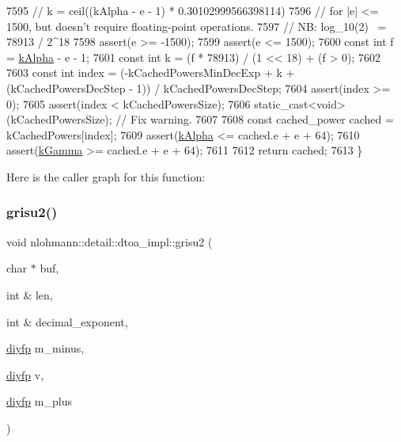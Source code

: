 \begin{DoxyCode}
7595     \textcolor{comment}{//      k = ceil((kAlpha - e - 1) * 0.30102999566398114)}
7596     \textcolor{comment}{// for |e| <= 1500, but doesn't require floating-point operations.}
7597     \textcolor{comment}{// NB: log\_10(2) ~= 78913 / 2^18}
7598     assert(e >= -1500);
7599     assert(e <=  1500);
7600     \textcolor{keyword}{const} \textcolor{keywordtype}{int} f = \hyperlink{namespacenlohmann_1_1detail_1_1dtoa__impl_ac1ea1316de0b4a219f707c76b1db1966}{kAlpha} - e - 1;
7601     \textcolor{keyword}{const} \textcolor{keywordtype}{int} k = (f * 78913) / (1 << 18) + (f > 0);
7602 
7603     \textcolor{keyword}{const} \textcolor{keywordtype}{int} index = (-kCachedPowersMinDecExp + k + (kCachedPowersDecStep - 1)) / kCachedPowersDecStep;
7604     assert(index >= 0);
7605     assert(index < kCachedPowersSize);
7606     \textcolor{keyword}{static\_cast<}\textcolor{keywordtype}{void}\textcolor{keyword}{>}(kCachedPowersSize); \textcolor{comment}{// Fix warning.}
7607 
7608     \textcolor{keyword}{const} cached\_power cached = kCachedPowers[index];
7609     assert(\hyperlink{namespacenlohmann_1_1detail_1_1dtoa__impl_ac1ea1316de0b4a219f707c76b1db1966}{kAlpha} <= cached.e + e + 64);
7610     assert(\hyperlink{namespacenlohmann_1_1detail_1_1dtoa__impl_a4a750fcc38da1ce68b7e25ab3a230e20}{kGamma} >= cached.e + e + 64);
7611 
7612     \textcolor{keywordflow}{return} cached;
7613 \}
\end{DoxyCode}
Here is the caller graph for this function\+:
\mbox{\label{namespacenlohmann_1_1detail_1_1dtoa__impl_a05b681dcb8569b9784c6dccfadb01633}} 
\subsubsection{\texorpdfstring{grisu2()}{grisu2()}\hspace{0.1cm}{\footnotesize\ttfamily [1/2]}}
{\footnotesize\ttfamily void nlohmann\+::detail\+::dtoa\+\_\+impl\+::grisu2 (\begin{DoxyParamCaption}\item[{char $\ast$}]{buf,  }\item[{int \&}]{len,  }\item[{int \&}]{decimal\+\_\+exponent,  }\item[{\hyperlink{structnlohmann_1_1detail_1_1dtoa__impl_1_1diyfp}{diyfp}}]{m\+\_\+minus,  }\item[{\hyperlink{structnlohmann_1_1detail_1_1dtoa__impl_1_1diyfp}{diyfp}}]{v,  }\item[{\hyperlink{structnlohmann_1_1detail_1_1dtoa__impl_1_1diyfp}{diyfp}}]{m\+\_\+plus }\end{DoxyParamCaption})\hspace{0.3cm}{\ttfamily [inline]}}

